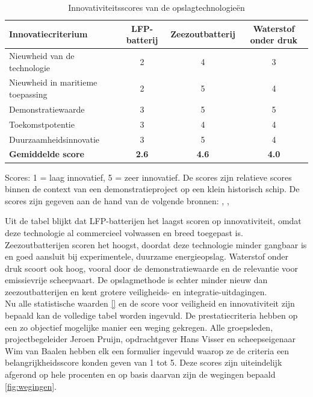 \begin{table}[H]
\centering
\caption{Innovativiteitsscores van de opslagtechnologieën}
\label{tab:innovativiteit_scores}
\renewcommand{\arraystretch}{1.25}
\begin{tabular}{l c c c}
\hline
\textbf{Innovatiecriterium}
& \textbf{LFP-batterij}
& \textbf{Zeezoutbatterij}
& \textbf{Waterstof onder druk} \\
\hline
Nieuwheid van de technologie & 2 & 4 & 3 \\
Nieuwheid in maritieme toepassing & 2 & 5 & 4 \\
Demonstratiewaarde & 3 & 5 & 5 \\
Toekomstpotentie & 3 & 4 & 4 \\
Duurzaamheidsinnovatie & 3 & 5 & 4 \\
\hline
\textbf{Gemiddelde score} & \textbf{2.6} & \textbf{4.6} & \textbf{4.0} \\
\hline
\end{tabular}

\vspace{0.2cm}
\footnotesize{Scores: 1 = laag innovatief, 5 = zeer innovatief. De scores zijn relatieve scores binnen de context van een demonstratieproject op een klein historisch schip. De scores zijn gegeven aan de hand van de volgende bronnen: \cite{iea2024batteries}, \cite{irena2025sodium}, \cite{emsa2023hydrogen}}
\end{table}


\noindent Uit de tabel blijkt dat LFP-batterijen het laagst scoren op innovativiteit, omdat deze technologie al commercieel volwassen en breed toegepast is. Zeezoutbatterijen scoren het hoogst, doordat deze technologie minder gangbaar is en goed aansluit bij experimentele, duurzame energieopslag. Waterstof onder druk scoort ook hoog, vooral door de demonstratiewaarde en de relevantie voor emissievrije scheepvaart. De opslagmethode is echter minder nieuw dan zeezoutbatterijen en kent grotere veiligheids- en integratie-uitdagingen.\\

\noindent Nu alle statistische waarden \ref{} en de score voor veiligheid en innovativiteit zijn bepaald kan de volledige tabel worden ingevuld. De prestatiecriteria hebben op een zo objectief mogelijke manier een weging gekregen. Alle groepsleden, projectbegeleider Jeroen Pruijn, opdrachtgever Hans Visser en scheepseigenaar Wim van Baalen hebben elk een formulier ingevuld waarop ze de criteria een belangrijkheidsscore konden geven van 1 tot 5. Deze scores zijn uiteindelijk afgerond op hele procenten en op basis daarvan zijn de wegingen bepaald \ref{fig:wegingen}.

